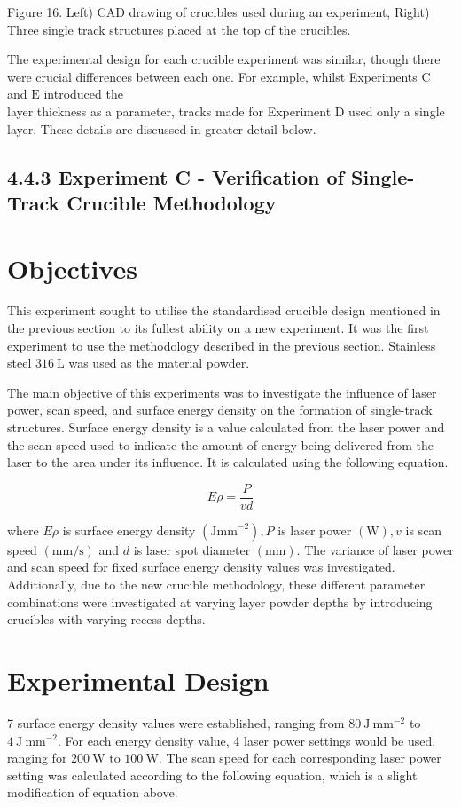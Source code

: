 \documentclass[10pt]{article}
\begin{document}
Figure 16. Left) CAD drawing of crucibles used during an experiment, Right) Three single track structures placed at the top of the crucibles.

The experimental design for each crucible experiment was similar, though there were crucial differences between each one. For example, whilst Experiments $\mathrm{C}$ and $\mathrm{E}$ introduced the\\
layer thickness as a parameter, tracks made for Experiment D used only a single layer. These details are discussed in greater detail below.

\subsection*{4.4.3 Experiment C - Verification of Single-Track Crucible Methodology}
\section*{Objectives}
This experiment sought to utilise the standardised crucible design mentioned in the previous section to its fullest ability on a new experiment. It was the first experiment to use the methodology described in the previous section. Stainless steel $316 \mathrm{~L}$ was used as the material powder.

The main objective of this experiments was to investigate the influence of laser power, scan speed, and surface energy density on the formation of single-track structures. Surface energy density is a value calculated from the laser power and the scan speed used to indicate the amount of energy being delivered from the laser to the area under its influence. It is calculated using the following equation.


\begin{equation*}
E \rho=\frac{P}{v d} \tag{7}
\end{equation*}


where $E \rho$ is surface energy density $\left(\mathrm{Jmm}^{-2}\right), P$ is laser power $(\mathrm{W}), v$ is scan speed $(\mathrm{mm} / \mathrm{s})$ and $d$ is laser spot diameter $(\mathrm{mm})$. The variance of laser power and scan speed for fixed surface energy density values was investigated. Additionally, due to the new crucible methodology, these different parameter combinations were investigated at varying layer powder depths by introducing crucibles with varying recess depths.

\section*{Experimental Design}
7 surface energy density values were established, ranging from $80 \mathrm{~J} \mathrm{~mm}^{-2}$ to $4 \mathrm{~J} \mathrm{~mm}^{-2}$. For each energy density value, 4 laser power settings would be used, ranging for $200 \mathrm{~W}$ to $100 \mathrm{~W}$. The scan speed for each corresponding laser power setting was calculated according to the following equation, which is a slight modification of equation above.
\end{document}

